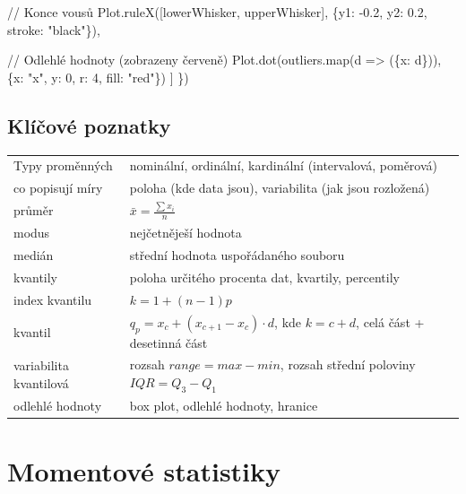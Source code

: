 \documentclass[
  czech,
  11pt,
  letterpaper,
  DIV=11,
  numbers=noendperiod]{scrreprt}
\newenvironment{Shaded}{\begin{snugshade}}{\end{snugshade}}
\newcommand{\NormalTok}[1]{\textcolor[rgb]{0.00,0.23,0.31}{#1}}
\newcounter{none} %
\begin{document}
\begin{Shaded}
\begin{Highlighting}[]
\NormalTok{    // Konce vousů}
\NormalTok{    Plot.ruleX([lowerWhisker, upperWhisker], \{y1: {-}0.2, y2: 0.2, stroke: "black"\}),}
    
\NormalTok{    // Odlehlé hodnoty (zobrazeny červeně)}
\NormalTok{    Plot.dot(outliers.map(d =\textgreater{} (\{x: d\})), \{x: "x", y: 0, r: 4, fill: "red"\})}
\NormalTok{  ]}
\NormalTok{\})}
\end{Highlighting}
\end{Shaded}

\section*{Klíčové poznatky}\label{kluxedux10dovuxe9-poznatky}


{\def\LTcaptype{none} %
\begin{longtable}[]{@{}
  >{\raggedright\arraybackslash}p{}
  >{\raggedright\arraybackslash}p{}@{}}
\toprule\noalign{}
\endhead
\bottomrule\noalign{}
\endlastfoot
Typy proměnných & nominální, ordinální, kardinální (intervalová,
poměrová) \\
co popisují míry & poloha (kde data jsou), variabilita (jak jsou
rozložená) \\
průměr & \(\bar{x}=\frac{\sum x_i}{n}\) \\
modus & nejčetněješí hodnota \\
medián & střední hodnota uspořádaného souboru \\
kvantily & poloha určitého procenta dat, kvartily, percentily \\
index kvantilu & \(k=1+(n-1)p\) \\
kvantil & \(q_p=x_c+(x_{c+1}-x_c)\cdot d\), kde \(k=c+d\), celá část +
desetinná část \\
variabilita kvantilová & rozsah \(range = max-min\), rozsah střední
poloviny \(IQR=Q_3-Q_1\) \\
odlehlé hodnoty & box plot, odlehlé hodnoty, hranice \\
\end{longtable}
}

\chapter{Momentové statistiky}\label{momentovuxe9-statistiky}
\end{document}
